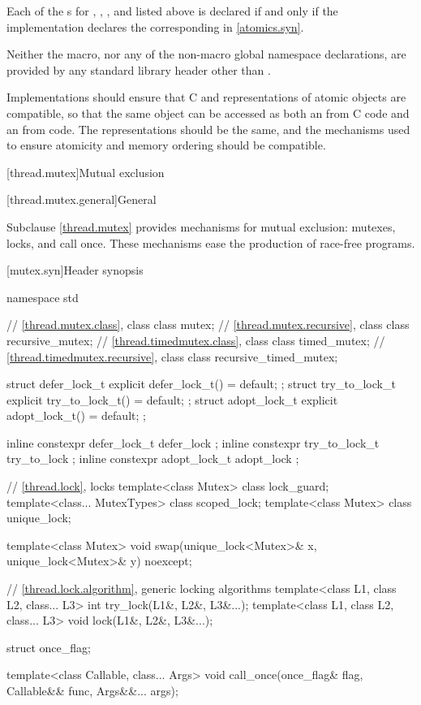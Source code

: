 \pnum
Each of the s for
, , , and 
listed above is declared if and only if the implementation declares
the corresponding  in \ref{atomics.syn}.

\pnum
Neither the  macro,
nor any of the non-macro global namespace declarations,
are provided by any \Cpp{} standard library header
other than .

\pnum
\recommended
Implementations should ensure
that C and \Cpp{} representations of atomic objects are compatible,
so that the same object can be accessed as both an 
from C code and an  from \Cpp{} code.
The representations should be the same, and
the mechanisms used to ensure atomicity and memory ordering
should be compatible.

[thread.mutex]{Mutual exclusion}

[thread.mutex.general]{General}

\pnum
Subclause \ref{thread.mutex} provides mechanisms for mutual exclusion: mutexes, locks, and call
once. These mechanisms ease the production of race-free
programs.

[mutex.syn]{Header  synopsis}

%
\begin{codeblock}
namespace std {
  // \ref{thread.mutex.class}, class 
  class mutex;
  // \ref{thread.mutex.recursive}, class 
  class recursive_mutex;
  // \ref{thread.timedmutex.class}, class 
  class timed_mutex;
  // \ref{thread.timedmutex.recursive}, class 
  class recursive_timed_mutex;

  struct defer_lock_t { explicit defer_lock_t() = default; };
  struct try_to_lock_t { explicit try_to_lock_t() = default; };
  struct adopt_lock_t { explicit adopt_lock_t() = default; };

  inline constexpr defer_lock_t  defer_lock { };
  inline constexpr try_to_lock_t try_to_lock { };
  inline constexpr adopt_lock_t  adopt_lock { };

  // \ref{thread.lock}, locks
  template<class Mutex> class lock_guard;
  template<class... MutexTypes> class scoped_lock;
  template<class Mutex> class unique_lock;

  template<class Mutex>
    void swap(unique_lock<Mutex>& x, unique_lock<Mutex>& y) noexcept;

  // \ref{thread.lock.algorithm}, generic locking algorithms
  template<class L1, class L2, class... L3> int try_lock(L1&, L2&, L3&...);
  template<class L1, class L2, class... L3> void lock(L1&, L2&, L3&...);

  struct once_flag;

  template<class Callable, class... Args>
    void call_once(once_flag& flag, Callable&& func, Args&&... args);
}
\end{codeblock}

